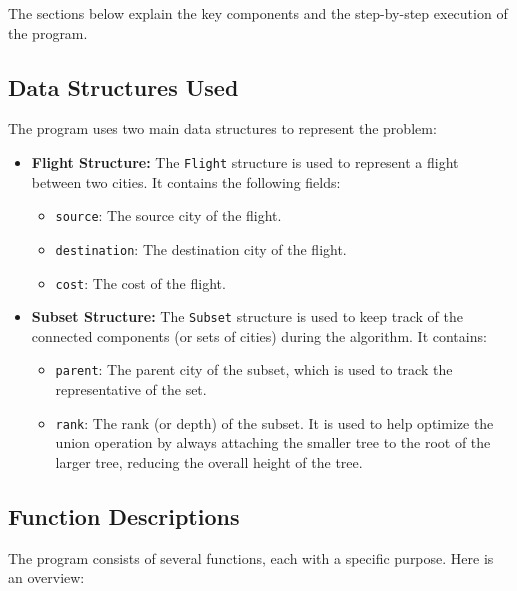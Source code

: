 \documentclass{book}
\begin{document}
The sections below explain the key components and the step-by-step execution of the program.

\subsection{Data Structures Used}

The program uses two main data structures to represent the problem:

\begin{itemize}
    \item \textbf{Flight Structure:} The \texttt{Flight} structure is used to represent a flight between two cities. It contains the following fields:
    \begin{itemize}
        \item \texttt{source}: The source city of the flight.
        \item \texttt{destination}: The destination city of the flight.
        \item \texttt{cost}: The cost of the flight.
    \end{itemize}

    \item \textbf{Subset Structure:} The \texttt{Subset} structure is used to keep track of the connected components (or sets of cities) during the algorithm. It contains:
    \begin{itemize}
        \item \texttt{parent}: The parent city of the subset, which is used to track the representative of the set.
        \item \texttt{rank}: The rank (or depth) of the subset. It is used to help optimize the union operation by always attaching the smaller tree to the root of the larger tree, reducing the overall height of the tree.
    \end{itemize}
\end{itemize}

\subsection{Function Descriptions}

The program consists of several functions, each with a specific purpose. Here is an overview:
\end{document}
